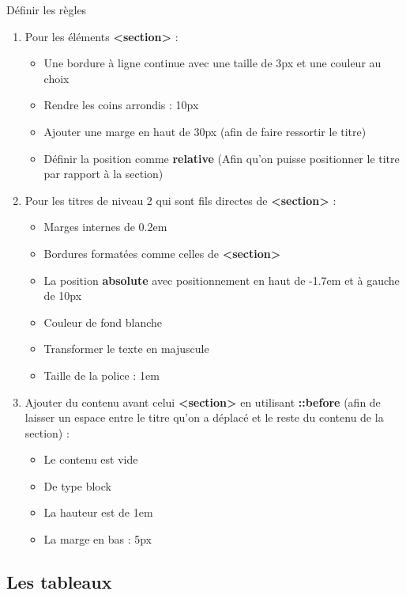 \documentclass[11pt, a4paper]{article}
\begin{document}
Définir les règles 
\begin{enumerate}
	\item Pour les éléments \textbf{<section>} :
	\begin{multicols}{2}
	\begin{itemize}
		\item Une bordure à ligne continue avec une taille de 3px et une couleur au choix
		\item Rendre les coins arrondis : 10px
		\item Ajouter une marge en haut de 30px (afin de faire ressortir le titre)
		\item Définir la position comme \textbf{relative} (Afin qu'on puisse positionner le titre par rapport à la section)
	\end{itemize} 
	\end{multicols}
	\item Pour les titres de niveau 2 qui sont fils directes de \textbf{<section>} :
	\begin{multicols}{2}
	\begin{itemize}
		\item Marges internes de 0.2em
		\item Bordures formatées comme celles de \textbf{<section>}
		\item La position \textbf{absolute} avec positionnement en haut de -1.7em et à gauche de 10px
		\item Couleur de fond blanche 
		\item Transformer le texte en majuscule 
		\item Taille de la police : 1em
	\end{itemize} 
	\end{multicols}
	\item Ajouter du contenu avant celui \textbf{<section>} en utilisant \textbf{::before} (afin de laisser un espace entre le  titre qu'on a déplacé et le reste du contenu de la section) :
	\begin{multicols}{2}
	\begin{itemize}
		\item Le contenu est vide
		\item De type block
		\item La hauteur est de 1em
		\item La marge en bas : 5px
	\end{itemize} 
	\end{multicols}
\end{enumerate}

\subsection*{Les tableaux}
\end{document}
